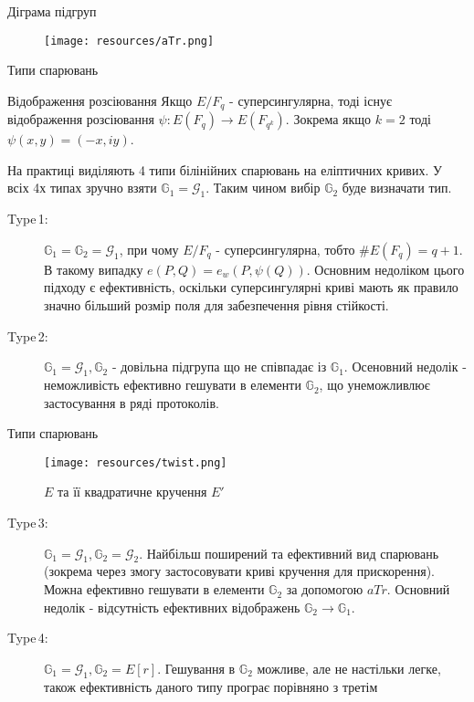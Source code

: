 \documentclass[9pt]{beamer}
\begin{document}
\begin{darkframes}
\begin{frame}{Діграма підгруп}
    \begin{figure}
        \centering
        \texttt{[image: resources/aTr.png]}
        \label{fig:enter-label}
    \end{figure}
\end{frame}

\begin{frame}{Типи спарювань}
    \begin{block}{Відображення розсіювання}
        Якщо $E/F_q$ - суперсингулярна, тоді існує відображення розсіювання $\psi:E(F_q) \to E(F_{q^k})$. Зокрема якщо $k=2$ тоді $\psi (x,y)=(-x,iy)$.
    \end{block}
    На практиці виділяють 4 типи білінійних спарювань на еліптичних кривих. У всіх 4х типах зручно взяти $\mathbb{G}_1 = \mathcal{G}_1$. Таким чином вибір $\mathbb{G}_2$ буде визначати тип.
      \begin{description}
    \item[Type\,1:] $\mathbb{G}_1=\mathbb{G}_2=\mathcal{G}_1$, при чому $E/F_q$ - суперсингулярна, тобто $\#E(F_q) = q+1$. В такому випадку $e(P,Q)=e_w(P,\psi(Q))$. Основним недоліком цього підходу є ефективність, оскільки суперсингулярні криві мають як правило значно більший розмір поля для забезпечення рівня стійкості.
    \item[Type\,2:] $\mathbb{G}_1=\mathcal{G}_1, \mathbb{G}_2$ - довільна підгрупа що не співпадає із $\mathbb{G}_1$. Осеновний недолік - неможливість ефективно гешувати в елементи $\mathbb{G}_2$, що унеможливлює застосування в ряді протоколів.
    
  \end{description}
\end{frame}
\begin{frame}{Типи спарювань}
    \begin{figure}
        \centering
        \texttt{[image: resources/twist.png]}
        \label{fig:enter-label}
        \caption{$E$ та її квадратичне кручення $E'$}
    \end{figure}
    \begin{description}
        \item[Type\,3:] $\mathbb{G}_1 = \mathcal{G}_1, \mathbb{G}_2=\mathcal{G}_2$. Найбільш поширений та ефективний вид спарювань (зокрема через змогу застосовувати криві кручення для прискорення). Можна ефективно гешувати в елементи $\mathbb{G}_2$ за допомогою $aTr$. Основний недолік - відсутність ефективних відображень $\mathbb{G}_2 \to \mathbb{G}_1$. 
        \item[Type\,4:] $\mathbb{G}_1 = \mathcal{G}_1, \mathbb{G}_2 = E[r]$. Гешування в $\mathbb{G}_2$ можливе, але не настільки легке, також ефективність даного типу програє порівняно з третім
    \end{description}
\end{frame}


\end{darkframes}
\end{document}
